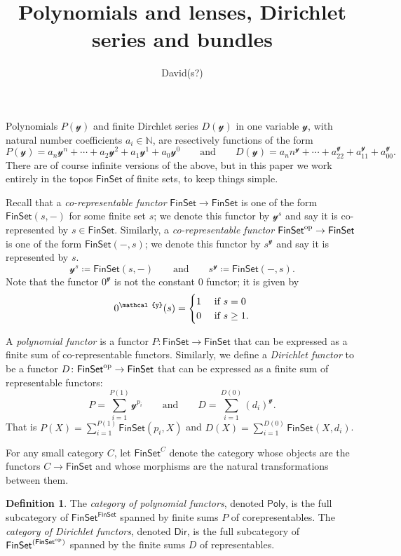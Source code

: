 \documentclass[11pt, article, one side]{memoir}
\theoremstyle{theorem}
\theoremstyle{definition}
\newtheorem{definition}[equation]{Definition}
\theoremstyle{remark}
\newcommand{\cat}[1]{\mathcal{#1}}%
\newcommand{\Cat}[1]{\mathsf{#1}}%
\newcommand{\op}{^\tn{op}}
\newcommand{\tn}[1]{\textnormal{#1}}
\newcommand{\nn}{\mathbb{N}}
\newcommand{\finset}{\Cat{FinSet}}
\newcommand{\yon}{\mathcal{y}}
\newcommand{\poly}{\Cat{Poly}}
\newcommand{\dir}{\Cat{Dir}}
\newcommand{\qqand}{\qquad\text{and}\qquad}
\begin{document}
\title{Polynomials and lenses, Dirichlet series and bundles}

\author{David(s?)}

\maketitle

Polynomials $P(\yon)$ and finite Dirchlet series $D(\yon)$ in one variable $\cat{y}$, with natural number coefficients $a_i\in\nn$, are resectively functions of the form
\[
  P(\yon)=a_n\yon^n+\cdots+a_2\yon^2+a_1\yon^1+a_0\yon^0
  \qqand
  D(\yon)=a_nn^\yon+\cdots+a_22^\yon+a_11^\yon+a_00^\yon.
\]
There are of course infinite versions of the above, but in this paper we work entirely in the topos $\finset$ of finite sets, to keep things simple.

Recall that a \emph{co-representable functor} $\finset\to\finset$ is one of the form $\finset(s, -)$ for some finite set $s$; we denote this functor by $\yon^s$ and say it is co-represented by $s\in\finset$. Similarly, a \emph{co-representable functor} $\finset\op\to\finset$ is one of the form $\finset(-,s)$; we denote this functor by $s^\yon$ and say it is represented by $s$.
\[
  \yon^s \coloneqq \finset(s,-)
  \qqand
  s^\yon\coloneqq\finset(-,s).
\]
Note that the functor $0^\yon$ is not the constant $0$ functor; it is given by
\[
0^\yon(s)=
\begin{cases}
1&\tn{ if } s=0\\
0&\tn{ if } s\geq1.
\end{cases}
\]

A \emph{polynomial functor} \cite{GambinoKock} is a functor $P\colon\finset\to\finset$ that can be expressed as a finite sum of co-representable functors. Similarly, we define a \emph{Dirichlet functor} to be a functor $D\colon\finset\op\to\finset$ that can be expressed as a finite sum of representable functors:
\[
  P=\sum_{i=1}^{P(1)}\yon^{p_i}
  \qqand
  D=\sum_{i=1}^{D(0)}(d_i)^\yon.
\]
That is $P(X)=\sum_{i=1}^{P(1)}\finset(p_i,X)$ and $D(X)=\sum_{i=1}^{D(0)}\finset(X,d_i)$.

For any small category $C$, let $\finset^C$ denote the category whose objects are the functors $C\to\finset$ and whose morphisms are the natural transformations between them.

\begin{definition}\label{def.poly_dir}
The \emph{category of polynomial functors}, denoted $\poly$, is the full subcategory of $\finset^\finset$ spanned by finite sums $P$ of corepresentables. The \emph{category of Dirichlet functors}, denoted $\dir$, is the full subcategory of $\finset^{(\finset\op)}$ spanned by the finite sums $D$ of representables.
\end{definition}
\end{document}
